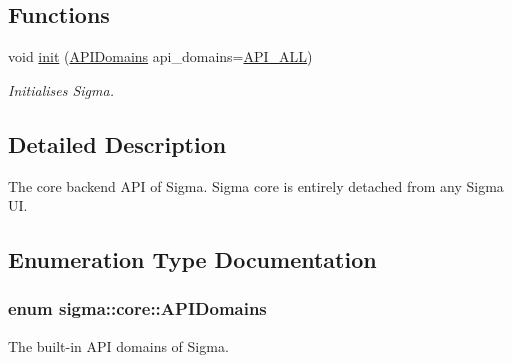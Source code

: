\subsection*{Functions}
\begin{DoxyCompactItemize}
\item 
void \hyperlink{namespacesigma_1_1core_ae59ffd8d8b483f24878a0bf7425c436c}{init} (\hyperlink{namespacesigma_1_1core_a48ec553a4adec5e4ca04a94946e39227}{A\+P\+I\+Domains} api\+\_\+domains=\hyperlink{namespacesigma_1_1core_a48ec553a4adec5e4ca04a94946e39227a5328f8d7cbf6b6709e5f314832bcb007}{A\+P\+I\+\_\+\+A\+L\+L})
\begin{DoxyCompactList}\small\item\em Initialises Sigma. \end{DoxyCompactList}\end{DoxyCompactItemize}


\subsection{Detailed Description}
The core backend A\+P\+I of Sigma. Sigma core is entirely detached from any Sigma U\+I. 

\subsection{Enumeration Type Documentation}
\hypertarget{namespacesigma_1_1core_a48ec553a4adec5e4ca04a94946e39227}{}
\subsubsection[{A\+P\+I\+Domains}]{\setlength{\rightskip}{0pt plus 5cm}enum {\bf sigma\+::core\+::\+A\+P\+I\+Domains}}\label{namespacesigma_1_1core_a48ec553a4adec5e4ca04a94946e39227}


The built-\/in A\+P\+I domains of Sigma. 

